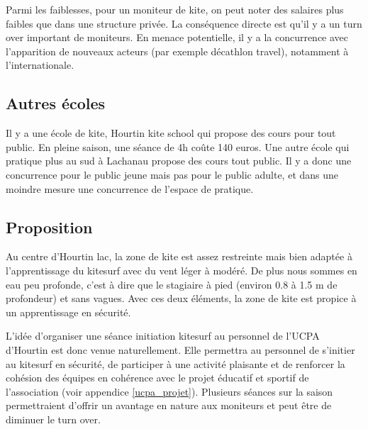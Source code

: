 \documentclass[11pt,a4paper]{report}
\begin{document}
Parmi les faiblesses, pour un moniteur de kite, on peut noter des
salaires plus faibles que dans une structure privée. 
La conséquence directe est qu'il y a un turn over important de moniteurs.
En menace potentielle, il y a  la concurrence avec 
l’apparition de nouveaux acteurs (par exemple décathlon travel),
notamment à l'internationale. 

\subsection{Autres écoles}

Il y a une école de kite, Hourtin kite school
qui propose des cours pour tout public. 
En pleine saison, une séance de 4h co\^ute 140 euros.
Une autre école qui pratique plus au sud à Lachanau propose
des cours tout public.
Il y a donc une concurrence pour le public jeune mais pas pour le public
adulte, et dans une moindre mesure une concurrence de l'espace de pratique.

\subsection{Proposition}


Au centre d'Hourtin lac, la zone de kite est assez restreinte 
mais bien adaptée à l'apprentissage
du kitesurf avec du vent léger à modéré. De plus nous sommes en 
eau peu profonde, c'est à dire que le stagiaire à pied (environ 0.8 à 1.5 m
de profondeur) et sans vagues. Avec ces deux éléments, la zone de kite 
est propice à un apprentissage en sécurité.


L'idée d'organiser une séance initiation kitesurf
au personnel de l'UCPA d'Hourtin est donc venue naturellement.
Elle permettra au personnel de s'initier au kitesurf en 
sécurité, de participer à une activité plaisante
et de renforcer la cohésion des équipes en cohérence avec le 
projet éducatif et sportif de l'association (voir appendice \ref{ucpa_projet}). 
Plusieurs séances sur la saison permettraient
d'offrir un avantage en nature aux moniteurs et peut \^etre 
de diminuer le turn over. 
\end{document}
